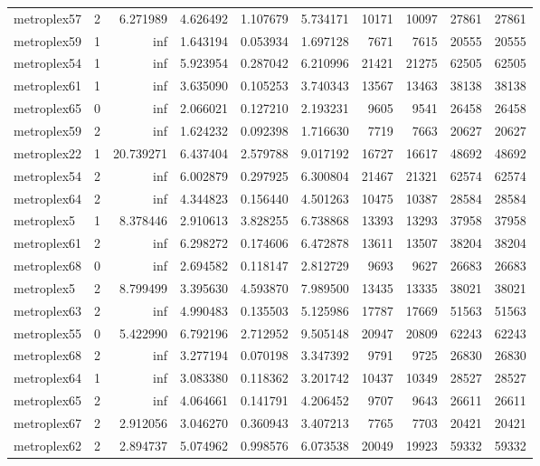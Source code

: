 \begin{longtable}{|l|r|r|r|r|r|r|r|r|r|}
metroplex57 & 2 & 6.271989 & 4.626492 & 1.107679 & 5.734171 & 10171 & 10097 & 27861 & 27861 \\
metroplex59 & 1 & inf & 1.643194 & 0.053934 & 1.697128 & 7671 & 7615 & 20555 & 20555 \\
metroplex54 & 1 & inf & 5.923954 & 0.287042 & 6.210996 & 21421 & 21275 & 62505 & 62505 \\
metroplex61 & 1 & inf & 3.635090 & 0.105253 & 3.740343 & 13567 & 13463 & 38138 & 38138 \\
metroplex65 & 0 & inf & 2.066021 & 0.127210 & 2.193231 & 9605 & 9541 & 26458 & 26458 \\
metroplex59 & 2 & inf & 1.624232 & 0.092398 & 1.716630 & 7719 & 7663 & 20627 & 20627 \\
metroplex22 & 1 & 20.739271 & 6.437404 & 2.579788 & 9.017192 & 16727 & 16617 & 48692 & 48692 \\
metroplex54 & 2 & inf & 6.002879 & 0.297925 & 6.300804 & 21467 & 21321 & 62574 & 62574 \\
metroplex64 & 2 & inf & 4.344823 & 0.156440 & 4.501263 & 10475 & 10387 & 28584 & 28584 \\
metroplex5 & 1 & 8.378446 & 2.910613 & 3.828255 & 6.738868 & 13393 & 13293 & 37958 & 37958 \\
metroplex61 & 2 & inf & 6.298272 & 0.174606 & 6.472878 & 13611 & 13507 & 38204 & 38204 \\
metroplex68 & 0 & inf & 2.694582 & 0.118147 & 2.812729 & 9693 & 9627 & 26683 & 26683 \\
metroplex5 & 2 & 8.799499 & 3.395630 & 4.593870 & 7.989500 & 13435 & 13335 & 38021 & 38021 \\
metroplex63 & 2 & inf & 4.990483 & 0.135503 & 5.125986 & 17787 & 17669 & 51563 & 51563 \\
metroplex55 & 0 & 5.422990 & 6.792196 & 2.712952 & 9.505148 & 20947 & 20809 & 62243 & 62243 \\
metroplex68 & 2 & inf & 3.277194 & 0.070198 & 3.347392 & 9791 & 9725 & 26830 & 26830 \\
metroplex64 & 1 & inf & 3.083380 & 0.118362 & 3.201742 & 10437 & 10349 & 28527 & 28527 \\
metroplex65 & 2 & inf & 4.064661 & 0.141791 & 4.206452 & 9707 & 9643 & 26611 & 26611 \\
metroplex67 & 2 & 2.912056 & 3.046270 & 0.360943 & 3.407213 & 7765 & 7703 & 20421 & 20421 \\
metroplex62 & 2 & 2.894737 & 5.074962 & 0.998576 & 6.073538 & 20049 & 19923 & 59332 & 59332 \\

\end{longtable}
